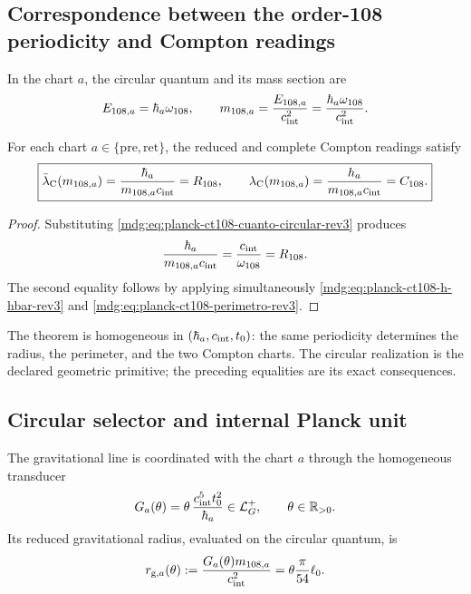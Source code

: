 \subsection{Correspondence between the order-108 periodicity and Compton readings}

In the chart \(a\), the circular quantum and its mass section are
\begin{equation}
 E_{108,a}=\hbar_a\omega_{108},
 \qquad
 m_{108,a}=\frac{E_{108,a}}{c_{\rm int}^{2}}
 =\frac{\hbar_a\omega_{108}}{c_{\rm int}^{2}}.
 \label{mdg:eq:planck-ct108-cuanto-circular-rev3}
\end{equation}

\begin{theorem}
\label{mdg:thm:planck-ct108-compton-rev3}
For each chart \(a\in\{\mathrm{pre},\mathrm{ret}\}\), the reduced and complete
Compton readings satisfy
\begin{equation}
 \boxed{
 \bar\lambda_{\rm C}(m_{108,a})
 =\frac{\hbar_a}{m_{108,a}c_{\rm int}}=R_{108},
 \qquad
 \lambda_{\rm C}(m_{108,a})
 =\frac{h_a}{m_{108,a}c_{\rm int}}=C_{108}.}
 \label{mdg:eq:planck-ct108-identidad-compton-rev3}
\end{equation}
\end{theorem}

\begin{proof}
Substituting
\eqref{mdg:eq:planck-ct108-cuanto-circular-rev3} produces
\[
 \frac{\hbar_a}{m_{108,a}c_{\rm int}}
 =\frac{c_{\rm int}}{\omega_{108}}=R_{108}.
\]
The second equality follows by applying simultaneously
\eqref{mdg:eq:planck-ct108-h-hbar-rev3} and
\eqref{mdg:eq:planck-ct108-perimetro-rev3}.
\end{proof}

The theorem is homogeneous in
\((\hbar_a,c_{\rm int},t_0)\): the same periodicity determines the radius,
the perimeter, and the two Compton charts. The circular realization is the
declared geometric primitive; the preceding equalities are its
exact consequences.

\subsection{Circular selector and internal Planck unit}

The gravitational line is coordinated with the chart \(a\) through the homogeneous
transducer
\begin{equation}
 G_a(\theta)=\theta\,
 \frac{c_{\rm int}^{5}t_0^2}{\hbar_a}
 \in\mathcal L_G^+,
 \qquad \theta\in\mathbb R_{>0}.
 \label{mdg:eq:planck-ct108-transductor-rev3}
\end{equation}
Its reduced gravitational radius, evaluated on the circular quantum, is
\begin{equation}
 r_{{\rm g},a}(\theta)
 :=\frac{G_a(\theta)m_{108,a}}{c_{\rm int}^{2}}
 =\theta\frac{\pi}{54}\ell_0.
 \label{mdg:eq:planck-ct108-radio-gravitatorio-rev3}
\end{equation}

